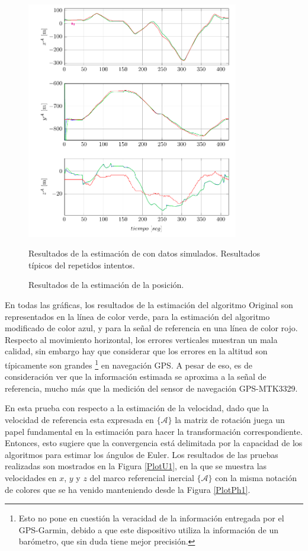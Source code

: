 \documentclass[conference]{IEEEtran}
\newcommand{\marco}[1]{\{\mathcal{#1}\}}
\begin{document}
\begin{figure}
\begin{center}
\includegraphics[width=25em]
{PlotPosition1.pdf}
\caption{Resultados de la estimación de la posición.}
\scriptsize{Resultados de la estimación de con datos simulados. Resultados típicos del repetidos intentos.}
\label{PlotX1}
\end{center}
\end{figure}
En todas las gráficas, los resultados de la estimación del algoritmo Original son representados en la línea de color verde, para la estimación del algoritmo modificado de color azul, y para la señal de referencia en una línea de color rojo.
Respecto al movimiento horizontal, los errores verticales muestran un mala calidad, sin embargo hay que considerar que los errores en la altitud son  típicamente son grandes \footnote{Esto no pone en cuestión la veracidad de la información entregada por el GPS-Garmin, debido a que este dispositivo utiliza la información de un barómetro, que sin duda tiene mejor precisión.} en navegación GPS. A pesar de eso, es de consideración ver que la información estimada se aproxima a la señal de referencia, mucho más que la medición del sensor de navegación GPS-MTK3329. \par
En esta prueba con respecto a la estimación de la velocidad, dado que la velocidad de referencia esta expresada en $\marco{A}$ la matriz de rotación juega un papel fundamental en la estimación para hacer la transformación correspondiente. Entonces, esto sugiere que la convergencia está delimitada por la capacidad de los algoritmos para estimar los ángulos de Euler. Los resultados de las pruebas realizadas son mostrados en la Figura \ref{PlotU1}, en la que se muestra las velocidades en $x$, $y$ y $z$ del marco referencial inercial $\marco{A}$ con la misma notación de colores que se ha venido manteniendo desde la Figura \ref{PlotPh1}.\par
\end{document}
